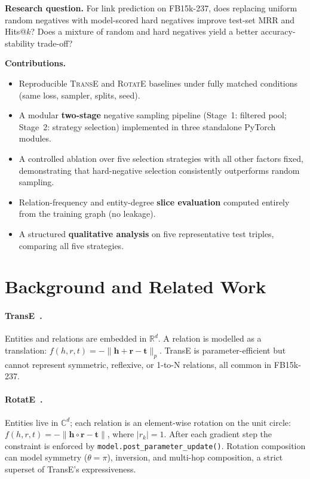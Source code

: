 \documentclass[10pt,twocolumn,letterpaper]{article}
\begin{document}
\textbf{Research question.} For link prediction on FB15k-237, does replacing
uniform random negatives with model-scored hard negatives improve test-set MRR
and Hits@$k$? Does a mixture of random and hard negatives yield a better
accuracy-stability trade-off?

\textbf{Contributions.}
\begin{itemize}
  \item Reproducible \textsc{TransE} and \textsc{RotatE} baselines under
    fully matched conditions (same loss, sampler, splits, seed).
  \item A modular \textbf{two-stage} negative sampling pipeline (Stage~1:
    filtered pool; Stage~2: strategy selection) implemented in three
    standalone PyTorch modules.
  \item A controlled ablation over five selection strategies with all other
    factors fixed, demonstrating that hard-negative selection consistently
    outperforms random sampling.
  \item Relation-frequency and entity-degree \textbf{slice evaluation}
    computed entirely from the training graph (no leakage).
  \item A structured \textbf{qualitative analysis} on five representative test
    triples, comparing all five strategies.
\end{itemize}

\section{Background and Related Work}
\label{sec:background}

\paragraph{TransE~\cite{bordes2013translating}.}
Entities and relations are embedded in $\mathbb{R}^d$. A relation is modelled as
a translation: $f(h,r,t)=-\|\mathbf{h}+\mathbf{r}-\mathbf{t}\|_p$. TransE is
parameter-efficient but cannot represent symmetric, reflexive, or 1-to-N
relations, all common in FB15k-237.

\paragraph{RotatE~\cite{sun2019rotate}.}
Entities live in $\mathbb{C}^d$; each relation is an element-wise rotation on
the unit circle: $f(h,r,t)=-\|\mathbf{h}\circ\mathbf{r}-\mathbf{t}\|$, where
$|r_k|=1$. After each gradient step the constraint is enforced by
\texttt{model.post\_parameter\_update()}.
Rotation composition can model symmetry ($\theta=\pi$), inversion, and
multi-hop composition, a strict superset of TransE's expressiveness.
\end{document}
